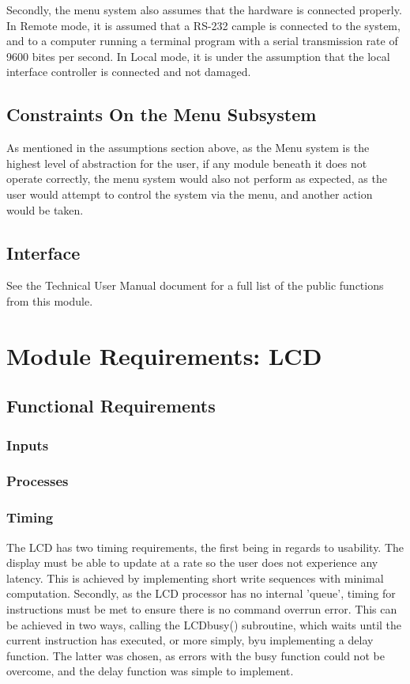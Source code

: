 \documentclass[]{report}
\begin{document}
Secondly, the menu system also assumes that the hardware is connected properly. In Remote mode, it is assumed that a RS-232 cample is connected to the system, and to a computer running a terminal program with a serial transmission rate of 9600 bites per second. In Local mode, it is under the assumption that the local interface controller is connected and not damaged. 

\subsection{Constraints On the Menu Subsystem}
As mentioned in the assumptions section above, as the Menu system is the highest level of abstraction for the user, if any module beneath it does not operate correctly, the menu system would also not perform as expected, as the user would attempt to control the system via the menu, and another action would be taken.

\subsection{Interface}
See the Technical User Manual document for a full list of the public functions from this module.

\section{Module Requirements: LCD}
\subsection{Functional Requirements}
\subsubsection{Inputs}

\subsubsection{Processes}

\subsubsection{Timing}
The LCD has two timing requirements, the first being in regards to usability. The display must be able to update at a rate so the user does not experience any latency. This is achieved by implementing short write sequences with minimal computation.\newline
Secondly, as the LCD processor has no internal 'queue', timing for instructions must be met to ensure there is no command overrun error. This can be achieved in two ways, calling the LCDbusy() subroutine, which waits until the current instruction has executed, or more simply, byu implementing a delay function. The latter was chosen, as errors with the busy function could not be overcome, and the delay function was simple to implement.
\end{document}
